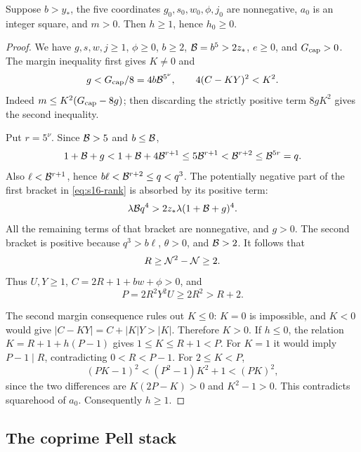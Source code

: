 \begin{lemma}\label{lem:s16-hguard}
Suppose \(b>y_*\), the five coordinates
\(g_0,s_0,w_0,\phi,j_0\) are nonnegative, \(a_0\) is an integer square,
and \(m>0\).  Then \(h\geq1\), hence \(h_0\geq0\).
\end{lemma}
\begin{proof}
We have \(g,s,w,j\geq1\), \(\phi\geq0\),
\(b\geq2\), \({\cal B}=b^5>2z_*\), \(e\geq0\),
and \(G_{\rm cap}>0\).
The margin inequality first gives \(K\neq0\) and
\begin{equation}
 g<G_{\rm cap}/8=4b{\cal B}^{5^\nu},
 \qquad
 4(C-KY)^2<K^2.
 \label{eq:s16-margin-consequences}
\end{equation}
Indeed \(m\leq K^2(G_{\rm cap}-8g)\); then discarding the strictly
positive term \(8gK^2\) gives the second inequality.

Put \(r=5^\nu\).  Since \({\cal B}>5\) and \(b\leq{\cal B}\),
\[
 1+{\cal B}+g
 <1+{\cal B}+4{\cal B}^{r+1}
 \leq5{\cal B}^{r+1}
 <{\cal B}^{r+2}
 \leq{\cal B}^{5r}=q.
\]
Also \(\ell<{\cal B}^{r+1}\), hence
\(b\ell<{\cal B}^{r+2}\leq q<q^3\).
The potentially negative part of the first bracket in
\eqref{eq:s16-rank} is absorbed by its positive term:
\[
 \lambda{\cal B}q^4
       >2z_*\lambda(1+{\cal B}+g)^4 .
\]
All the remaining terms of that bracket are nonnegative, and \(g>0\).
The second bracket is positive because \(q^3>b\ell\), \(\theta>0\),
and \({\cal B}>2\).
It follows that
\[
 R\geq{\cal N}^2-{\cal N}\geq2.
\]
Thus \(U,Y\geq1\), \(C=2R+1+bw+\phi>0\), and
\[
 P=2R^2Y^2U\geq2R^2>R+2.
\]

The second margin consequence rules out \(K\leq0\):
\(K=0\) is impossible, and \(K<0\) would give
\(|C-KY|=C+|K|Y>|K|\).
Therefore \(K>0\).
If \(h\leq0\), the relation \(K=R+1+h(P-1)\) gives
\(1\leq K\leq R+1<P\).
For \(K=1\) it would imply \(P-1\mid R\), contradicting
\(0<R<P-1\).
For \(2\leq K<P\),
\[
 (PK-1)^2<(P^2-1)K^2+1<(PK)^2,
\]
since the two differences are \(K(2P-K)>0\) and \(K^2-1>0\).
This contradicts squarehood of \(a_0\).
Consequently \(h\geq1\).
\end{proof}

\subsection{The coprime Pell stack}

